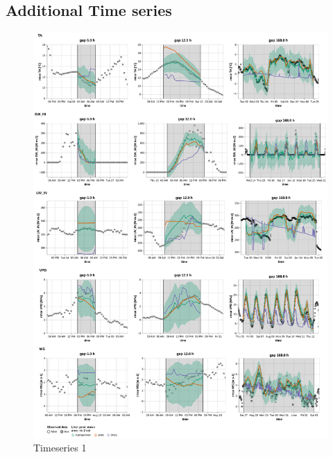 \documentclass{article}
\newcommand{\imgwidth}{6in}
\let\Oldsubsection\subsection
\renewcommand{\subsection}{\FloatBarrier\Oldsubsection}
\begin{document}
\subsection{Additional Time series}

\begin{figure}
\centerline{\includegraphics[width=\imgwidth]{timeseries_1_1}}
\caption{Timeseries 1}
\label{fig:ts_1_1}
\end{figure}
\end{document}

